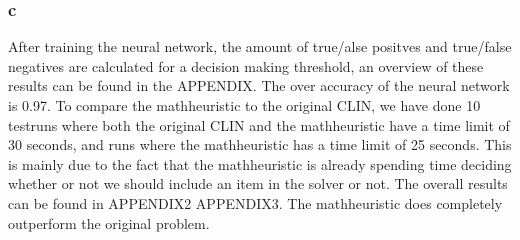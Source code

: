 \subsubsection*{c}
After training the neural network, the amount of true/alse positves and true/false negatives are calculated for a decision making threshold, an overview of these results can be found in the APPENDIX. The over accuracy of the neural network is 0.97. To compare the mathheuristic to the original CLIN, we have done 10 testruns where both the original CLIN and the mathheuristic have a time limit of 30 seconds, and runs where the mathheuristic has a time limit of 25 seconds. This is mainly due to the fact that the mathheuristic is already spending time deciding whether or not we should include an item in the solver or not. The overall results can be found in APPENDIX2 APPENDIX3. The mathheuristic does completely outperform the original problem.
